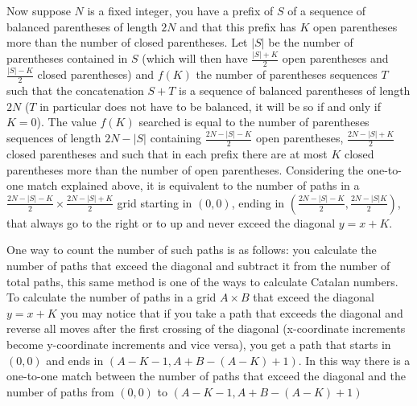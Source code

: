 \documentclass{article}
\newcommand\catalannumber[4]{
  \fill[cyan!25]  (0,- #1 - 1) rectangle +(#2,#1);
  \draw (0, - #1 -1) grid +(#2,#1);
  
  \draw[dashed] (0,-#1 - 1 + #4) -- +(#1 - #4,#1 - #4);
  \coordinate (prev) at (0, - #1 -1);
  \foreach \dir in {#3}{
    \ifnum\dir=0
    \coordinate (dep) at (1,0);
    \else
        \ifnum\dir=1
        \coordinate (dep) at (0,1);
        \else
            \ifnum\dir=2
            \coordinate (dep) at (-1,0);
            \else
            \coordinate (dep) at (0,-1);
            \fi
        \fi
    \fi
    \draw[line width=2pt,-stealth,red] (prev) -- ++(dep) coordinate (prev);
  };
}
\begin{document}
\begin{center}
    \captionsetup{type=figure, width=.76\linewidth}
\end{center}
Now suppose $N$ is a fixed integer, you have a prefix of $S$ of a sequence of balanced parentheses of length $2N$ and that this prefix has $K$ open parentheses more than the number of closed parentheses. Let $|S|$ be the number of parentheses contained in $S$ (which will then have $\frac{|S|+K}{2}$ open parentheses and $\frac{|S|-K}{2}$ closed parentheses) and $f(K)$ the number of parentheses sequences $T$ such that the concatenation $S+T$ is a sequence of balanced parentheses of length $2N$ ($T$ in particular does not have to be balanced, it will be so if and only if $K=0$). The value $f(K)$ searched is equal to the number of parentheses sequences of length $2N-|S|$ containing $\frac{2N-|S|-K}{2}$ open parentheses, $\frac{2N-|S|+K}{2}$ closed parentheses and such that in each prefix there are at most $K$ closed parentheses more than the number of open parentheses. Considering the one-to-one match explained above, it is equivalent to the number of paths in a $\frac{2N-|S|-K}{2} \times \frac{2N-|S|+K}{2}$ grid starting in $(0,0)$, ending in $(\frac{2N-|S|-K}{2},\frac{2N-|S|K}{2})$, that always go to the right or to up and never exceed the diagonal $y=x+K$.
\begin{center}
    \captionsetup{type=figure, width=.76\linewidth}
\end{center}
One way to count the number of such paths is as follows: you calculate the number of paths that exceed the diagonal and subtract it from the number of total paths, this same method is one of the ways to calculate Catalan numbers. To calculate the number of paths in a grid $A \times B$ that exceed the diagonal $y=x+K$ you may notice that if you take a path that exceeds the diagonal and reverse all moves after the first crossing of the diagonal (x-coordinate increments become y-coordinate increments and vice versa), you get a path that starts in $(0,0)$ and ends in $(A-K-1,A+B-(A-K)+1)$. In this way there is a one-to-one match between the number of paths that exceed the diagonal and the number of paths from $(0,0)$ to $(A-K-1,A+B-(A-K)+1)$
\end{document}
